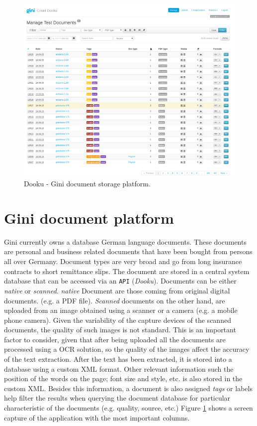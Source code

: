 \begin{figure}[h]
    \centering
    \includegraphics[width=\textwidth]{images/001-dooku-screenshot.png}
    \caption{Dooku - Gini document storage platform.}
    \label{fig:dooku_screenshot}
\end{figure}

\section{Gini document platform}
\label{sec:gini_doc_platform}

Gini currently owns a database  German language documents. These documents 
are personal and business related documents that have been bought 
from  persons all over Germany. Document types are very broad and go from
long insurance contracts to short remittance slips. The document are stored
in a central system database that can be accessed via an  \texttt{API} (\textsl{Dooku}).
Documents can be either \textit{native} or \textit{scanned}. 
\textit{native} Document are those  coming  from original digital documents. (e.g. a
PDF file). \textit{Scanned} documents on the other hand, are uploaded
from an image obtained using a scanner or a camera (e.g. a mobile phone 
camera). Given the variability of the capture devices of the scanned
documents, the quality of such images is not standard.
This is an important factor to consider, given that after being uploaded all the
documents are processed using a \ac{OCR} solution, so the quality of the
images affect the accuracy of the text extraction. 
After the text has been extracted, it is stored  into a database using a custom
\textsc{XML} format. Other relevant information such the position of the
words on the page; font size and style, etc.  is also stored in the custom
\textsc{XML}.  Besides this information, a document is also assigned
\textit{tags} or labels help filter the results  when querying the document database for
particular characteristic of the documents
(e.g. quality, source, etc.)   Figure \ref{fig:dooku_screenshot} shows a screen capture of the application with the
most important columns.


